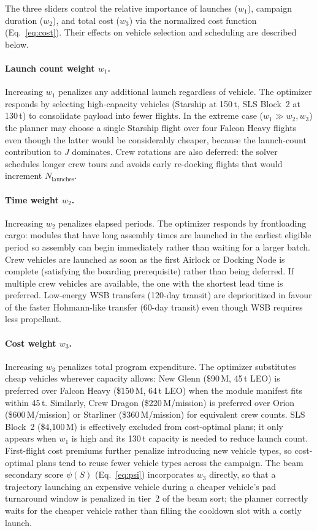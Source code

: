 The three sliders control the relative importance of launches
($w_1$), campaign duration ($w_2$), and total cost ($w_3$) via
the normalized cost function (Eq.~\ref{eq:cost}). Their effects
on vehicle selection and scheduling are described below.

\paragraph{Launch count weight $w_1$.}
Increasing $w_1$ penalizes any additional launch regardless of
vehicle. The optimizer responds by selecting high-capacity
vehicles (Starship at 150\,t, SLS Block~2 at 130\,t) to
consolidate payload into fewer flights. In the extreme case
($w_1 \gg w_2, w_3$) the planner may choose a single
Starship flight over four Falcon Heavy flights even though the
latter would be considerably cheaper, because the launch-count
contribution to $J$ dominates. Crew rotations are also
deferred: the solver schedules longer crew tours and avoids
early re-docking flights that would increment $N_{\mathrm{launches}}$.

\paragraph{Time weight $w_2$.}
Increasing $w_2$ penalizes elapsed periods. The optimizer
responds by frontloading cargo: modules that have long assembly
times are launched in the earliest eligible period so assembly
can begin immediately rather than waiting for a larger batch.
Crew vehicles are launched as soon as the first Airlock or
Docking Node is complete (satisfying the boarding prerequisite)
rather than being deferred. If multiple crew vehicles are
available, the one with the shortest lead time is preferred.
Low-energy WSB transfers (120-day transit) are deprioritized
in favour of the faster Hohmann-like transfer (60-day transit)
even though WSB requires less propellant.

\paragraph{Cost weight $w_3$.}
Increasing $w_3$ penalizes total program expenditure. The
optimizer substitutes cheap vehicles wherever capacity allows:
New Glenn (\$90\,M, 45\,t LEO) is preferred over Falcon Heavy
(\$150\,M, 64\,t LEO) when the module manifest fits within
45\,t. Similarly, Crew Dragon (\$220\,M/mission) is preferred
over Orion (\$600\,M/mission) or Starliner (\$360\,M/mission)
for equivalent crew counts. SLS Block~2 (\$4{,}100\,M) is
effectively excluded from cost-optimal plans; it only appears
when $w_1$ is high and its 130\,t capacity is needed to reduce
launch count. First-flight cost premiums further penalize
introducing new vehicle types, so cost-optimal plans tend to
reuse fewer vehicle types across the campaign.
The beam secondary score $\psi(S)$ (Eq.~\ref{eq:psi}) incorporates
$w_3$ directly, so that a trajectory launching an expensive vehicle
during a cheaper vehicle's pad turnaround window is penalized in
tier~2 of the beam sort; the planner correctly waits for the cheaper
vehicle rather than filling the cooldown slot with a costly launch.

